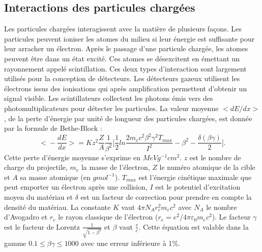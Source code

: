 \subsection{Interactions des particules chargées}
\label{sec.charged_in_matter}
Les particules chargées interagissent avec la matière de plusieurs façons. Les particules peuvent ioniser les atomes du milieu si leur énergie est suffisante pour leur arracher un électron. Après le passage d'une particule chargée, les atomes peuvent être dans un état excité. Ces atomes se désexcitent en émettant un rayonnement appelé scintillation. Ces deux types d'interaction sont largement utilisés pour la conception de détecteurs. Les détecteurs gazeux utilisent les électrons issus des ionisations qui après amplification permettent d'obtenir un signal visible. Les scintillateurs collectent les photons émis vers des photomultiplicateurs pour détecter les particules. La valeur moyenne $\big<dE/dx\big>$, de la perte d'énergie  par unité de longueur des particules chargées, est donnée par la formule de Bethe-Block \cite{pdg}:
\begin{equation}
  \big<-\frac{dE}{dx}\big>=Kz^2\frac{Z}{A}\frac{1}{\beta^2}\big[\frac{1}{2}ln\frac{2m_ec^2\beta^2\gamma^2T_{max}}{I^2}-\beta^2-\frac{\delta(\beta\gamma)}{2}\big].
\label{eq.bethe}
\end{equation}
Cette perte d'énergie moyenne s'exprime en $MeV g^{-1} cm^2$. $z$ est le nombre de charge du projectile, $m_e$ la masse de l'électron, $Z$ le numéro atomique de la cible et $A$ sa masse atomique (en $g mol^{-1}$). $T_{max}$ est l'énergie cinétique maximale que peut emporter un électron après une collision, $I$ est le potentiel d'excitation moyen du matériau et $\delta$ est un facteur de correction pour prendre en compte la densité du matériau. La constante $K$ vaut $4\pi N_Ar_e^2m_ec^2$ avec $N_A$ le nombre d'Avogadro et $r_e$ le rayon classique de l'électron ($r_e=e^2/4\pi\varepsilon_0m_ec^2$). Le facteur $\gamma$ est le facteur de Lorentz $\frac{1}{\sqrt{1-\beta^2}}$ et $\beta$ vaut $\frac{v}{c}$. Cette équation est valable dans la gamme $0.1\leq\beta\gamma\leq1000$ avec une erreur inférieure à 1$\%$. 

